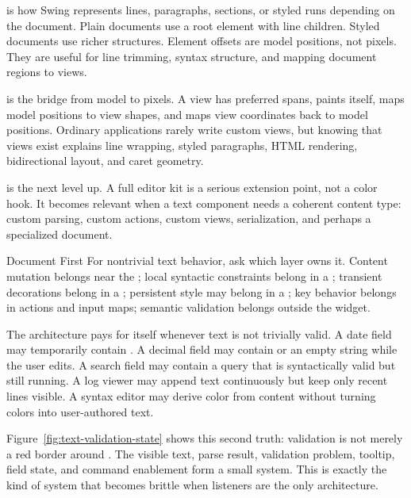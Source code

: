  is how Swing represents lines, paragraphs, sections, or styled runs depending on the document. Plain documents use a root element with line children. Styled documents use richer structures. Element offsets are model positions, not pixels. They are useful for line trimming, syntax structure, and mapping document regions to views.

 is the bridge from model to pixels. A view has preferred spans, paints itself, maps model positions to view shapes, and maps view coordinates back to model positions. Ordinary applications rarely write custom views, but knowing that views exist explains line wrapping, styled paragraphs, HTML rendering, bidirectional layout, and caret geometry.

 is the next level up. A full editor kit is a serious extension point, not a color hook. It becomes relevant when a text component needs a coherent content type: custom parsing, custom actions, custom views, serialization, and perhaps a specialized document.

\begin{principlebox}{Document First}
For nontrivial text behavior, ask which layer owns it. Content mutation belongs near the ; local syntactic constraints belong in a ; transient decorations belong in a ; persistent style may belong in a ; key behavior belongs in actions and input maps; semantic validation belongs outside the widget.
\end{principlebox}

The architecture pays for itself whenever text is not trivially valid. A date field may temporarily contain . A decimal field may contain \api{-} or an empty string while the user edits. A search field may contain a query that is syntactically valid but still running. A log viewer may append text continuously but keep only recent lines visible. A syntax editor may derive color from content without turning colors into user-authored text.

Figure~\ref{fig:text-validation-state} shows this second truth: validation is not merely a red border around . The visible text, parse result, validation problem, tooltip, field state, and command enablement form a small system. This is exactly the kind of system that becomes brittle when listeners are the only architecture.

